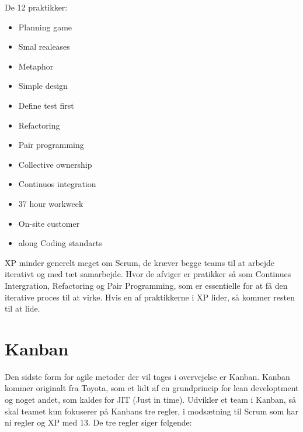 De 12 praktikker: 



\begin{itemize}
    \item Planning game

    \item Smal realeases
  
    \item Metaphor

    \item Simple design 

    \item Define test first

    \item Refactoring
 
    \item Pair programming

    \item Collective ownership
   
    \item Continuos integration 

    \item 37 hour workweek 

    \item On-site customer 
    
    \item along Coding standarts 


\end{itemize}

XP minder generelt meget om Scrum, de kræver begge teams til at arbejde iterativt og med tæt samarbejde. Hvor de afviger er pratikker så som Continues Intergration, Refactoring og Pair Programming, som er essentielle for at få den iterative proces til at virke. Hvis en af praktikkerne i XP lider, så kommer resten til at lide. 



\section{Kanban}

Den sidste form for agile metoder der vil tages i overvejelse er Kanban. Kanban kommer originalt fra Toyota, som et lidt af en grundprincip for lean developtment og noget andet, som kaldes for JIT (Just in time). \cite{SlideKanban} Udvikler et team i Kanban, så skal teamet kun fokuserer på Kanbans tre regler, i modsætning til Scrum som har ni regler og XP med 13.        De tre regler siger følgende: 

